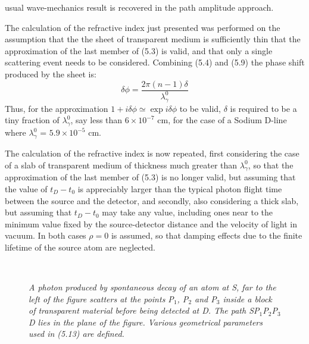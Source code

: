 {  usual wave-mechanics result is recovered in the path amplitude approach.
  \par The calculation of the refractive index just presented was performed on the
  assumption that the the sheet of transparent medium is sufficiently thin that
  the approximation of the last member of (5.3) is valid, and that only a single 
   scattering event needs to be considered. Combining (5.4) and (5.9) the phase shift 
   produced by the sheet is:
    \begin{equation}
  \delta \phi = \frac{2 \pi (n-1) \delta}{\lambda_{\gamma}^0}
    \end{equation}
 Thus, for the approximation $1+i\delta \phi \simeq \exp i \delta \phi$ to be valid,
  $ \delta $ is required to be a tiny fraction of $\lambda_{\gamma}^0$, say less than $6 \times 10^{-7}$ cm,
  for the case of a Sodium D-line where $\lambda_{\gamma}^0$ =  $5.9 \times 10^{-5}$ cm. 
  \par The calculation of the refractive index is now repeated, first considering the case of a 
   slab of transparent medium of thickness much greater than  $\lambda_{\gamma}^0$, so that 
   the approximation of the last member of (5.3) is no longer valid, but assuming that
   the value of $t_D-t_0$ is appreciably larger than the typical photon flight time between the source
   and the detector, and secondly, also considering a thick slab, but assuming that $t_D-t_0$ may take
   any value, including ones near to the minimum value fixed by the source-detector
   distance and the velocity of light in vacuum. In both cases $\rho = 0$ is assumed, so that damping
   effects due to the finite lifetime of the source atom are neglected.

\begin{figure}[htbp]
\begin{center}
\hspace*{-0.5cm}\mbox{
}
\caption{{\sl A photon produced by spontaneous decay of an atom at S, far to the left
 of the figure scatters at the points P$_1$, P$_2$  and P$_3$  inside a block
 of transparent material before being detected at D. The path SP$_1$P$_2$P$_3$D
  lies in the plane of the figure. Various geometrical parameters used in (5.13)
 are defined.}} 
\label{fig-fig3}
\end{center}
\end{figure}


}
